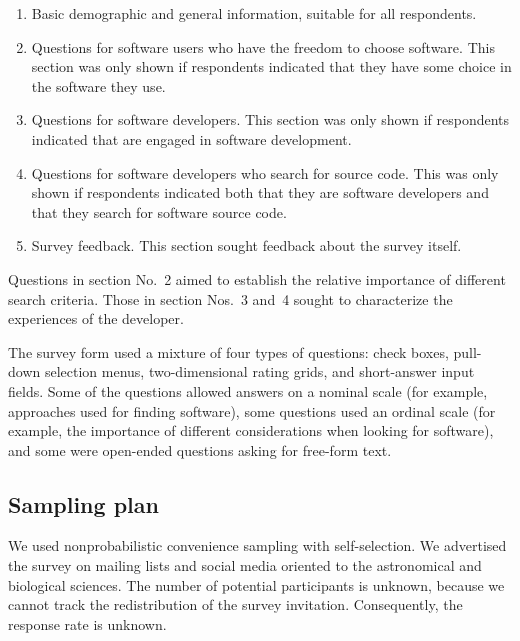 \documentclass{casicswhitepaper}
\begin{document}
\begin{enumerate}

\item Basic demographic and general information, suitable for all respondents.

\item Questions for software users who have the freedom to choose software.  This section was only shown if respondents indicated that they have some choice in the software they use.

\item Questions for software developers.  This section was only shown if respondents indicated that are engaged in software development.

\item Questions for software developers who search for source code.  This was only shown if respondents indicated both that they are software developers and that they search for software source code.

\item Survey feedback.  This section sought feedback about the survey itself.

\end{enumerate}

Questions in section No.~2 aimed to establish the relative importance of different search criteria.  Those in section Nos.~3 and~4 sought to characterize the experiences of the developer.

The survey form used a mixture of four types of questions: check boxes, pull-down selection menus, two-dimensional rating grids, and short-answer input fields.  Some of the questions allowed answers on a nominal scale (for example, approaches used for finding software), some questions used an ordinal scale (for example, the importance of different considerations when looking for software), and some were open-ended questions asking for free-form text.


\subsection{Sampling plan}

We used nonprobabilistic convenience sampling with self-selection.  We advertised the survey on mailing lists and social media oriented to the astronomical and biological sciences.    The number of potential participants is unknown, because we cannot track the redistribution of the survey invitation.  Consequently, the response rate is unknown.
\end{document}
